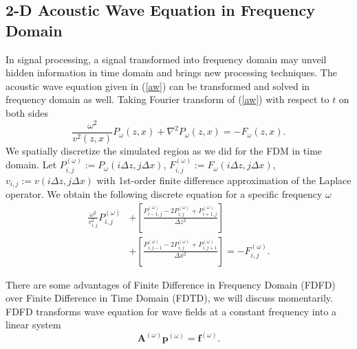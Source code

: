 \documentclass[12pt]{article}
\newcommand{\bA}{\boldsymbol{A}}
\newcommand{\bff}{\boldsymbol{f}}
\newcommand{\bp}{\boldsymbol{p}}
\theoremstyle{plain}
\theoremstyle{definition}
\theoremstyle{remark}
\numberwithin{equation}{section}
\begin{document}
\subsection{2-D Acoustic Wave Equation in Frequency Domain}
In signal processing, a signal transformed into frequency domain may unveil hidden information in time domain and brings new processing
techniques. The acoustic wave equation given in (\ref{aw}) can be transformed and solved in frequency domain as well. 
Taking Fourier transform of (\ref{aw}) with respect to $t$ on both sides
  \begin{equation}
  \frac{\omega^2}{v^2(z, x)}P_{\omega}(z, x) + \nabla^2 P_{\omega}(z, x) =- F_{\omega}(z, x).
  \end{equation}
  We spatially discretize the simulated region as we did for the FDM in time domain.  
  Let $P_{i,j}^{(\omega)} := P_{\omega}(i\Delta z, j\Delta x)$, $F_{i,j}^{(\omega)} := 
  F_{\omega}(i\Delta z, j\Delta x)$, $v_{i,j} := v(i\Delta z, j\Delta x)$  with 1st-order finite difference approximation of the Laplace operator.
  We obtain the following discrete equation for a specific frequency $\omega$
  \begin{equation}
  \begin{aligned}
  \frac{\omega^2}{v_{i,j}^2} P_{i,j}^{(\omega)} &+\left[ \frac{P_{i-1,j}^{(\omega)} - 2P_{i,j}^{(\omega)} + P_{i+1,j}^{(\omega)}}{\Delta z^2} \right] \\&+\left[ \frac{P_{i,j-1}^{(\omega)} - 2P_{i,j}^{(\omega)} + P_{i,j+1}^{(\omega)}}{\Delta x^2} \right] =- F_{i,j}^{(\omega)}.
  \end{aligned}
  \end{equation}
  
There are some advantages of Finite Difference in Frequency Domain (FDFD) over Finite Difference in Time Domain (FDTD), we will discuss momentarily. FDFD transforms wave equation for wave fields at a constant frequency into a linear system 
\begin{equation}\label{awfreq}
\bA^{(\omega)}\bp^{(\omega)} = \bff^{(\omega)}.
\end{equation}
\end{document}
